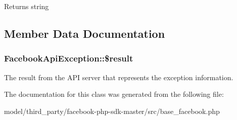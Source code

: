 \begin{DoxyReturn}{Returns}
string 
\end{DoxyReturn}


\subsection{Member Data Documentation}
\hypertarget{classFacebookApiException_a7fb784ca5b949e79541f48d411cea829}{
\subsubsection[{\$result}]{\setlength{\rightskip}{0pt plus 5cm}Facebook\-Api\-Exception\-::\$result\hspace{0.3cm}{\ttfamily [protected]}}}\label{classFacebookApiException_a7fb784ca5b949e79541f48d411cea829}
The result from the A\-P\-I server that represents the exception information. 

The documentation for this class was generated from the following file\-:\begin{DoxyCompactItemize}
\item 
model/third\-\_\-party/facebook-\/php-\/sdk-\/master/src/base\-\_\-facebook.\-php\end{DoxyCompactItemize}
